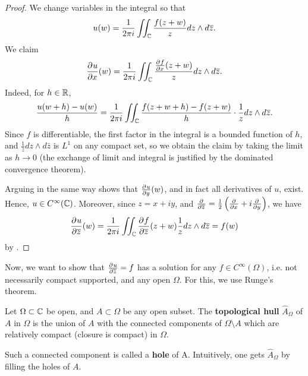 \documentclass[11pt]{article}
\begin{document}
\begin{proof}
    We change variables in the integral so that
    $$u(w) = \frac{1}{2\pi i } \iint _{\mathbb{C}} \frac{f(z+w)}{z}dz\land d \overline z.$$
    We claim $$\frac{\partial^{}u}{\partial x^{}}(w) =\frac{1}{2\pi i }\iint _{\mathbb{C}} \frac{\frac{\partial^{}f}{\partial x^{}}(z+w)}{z}dz \land d \overline z.$$
    Indeed, for $h \in \mathbb{R}$,
    $$\frac{u(w+h)-u(w)}{h}=\frac{1}{2\pi i}\iint_{\mathbb{C}} \frac{f(z+w+h)-f(z+w)}{h}\cdot \frac{1}{z} dz \land d \overline z.$$
    Since $f$ is differentiable, the first factor in the integral is a bounded function of $h$, and $\frac{1}{z}dz \land d\bar z$ is $L^1$ on any compact set, so we obtain the claim by taking the limit as $h \to 0$ (the exchange of limit and integral is justified by the dominated convergence theorem).

    Arguing in the same way shows that $\frac{\partial^{}u}{\partial y^{}}(w) $, and in fact all derivatives of $u$, exist. Hence, $u \in C^\infty (\mathbb{C})$. Moreover, since $z=x+iy$, and $\frac{\partial^{}}{\partial \overline z^{}}=\frac{1}{2}\left ( \frac{\partial^{}}{\partial x^{}}+i\frac{\partial^{}}{\partial y^{}} \right )$, we have
    $$\frac{\partial^{}u}{\partial \overline z^{}}(w) = \frac{1}{2 \pi i} \iint_{\mathbb{C}} \frac{\partial^{}f}{\partial \overline z^{}}(z+w)\frac{1}{z}dz \land d \overline z = f(w)$$
    by .
\end{proof}

Now, we want to show that $\frac{\partial^{}u}{\partial \overline z^{}}=f$ has a solution for any $f\in C^\infty (\Omega)$, i.e. not necessarily compact supported, and any open $\Omega$. For this, we use Runge's theorem.

\begin{defn}
    Let $\Omega \subset \mathbb{C}$ be open, and $A \subset \Omega$ be any open subset. The \textbf{topological hull} $\hat A_\Omega$ of $A$ in $\Omega$ is the union of $A$ with the connected components of $\Omega \setminus A$ which are relatively compact (closure is compact) in $\Omega$.

    Such a connected component is called a \textbf{hole} of A. Intuitively, one gets $\hat A_\Omega$ by filling the holes of $A$.
\end{defn}
\end{document}
